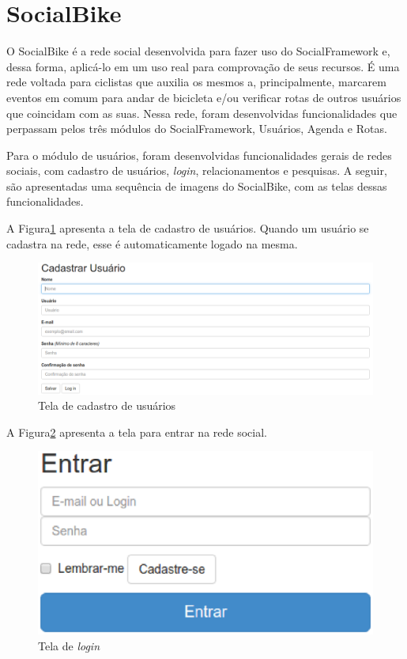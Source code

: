 \section{SocialBike}
\label{sec:SocialBike}

O SocialBike é a rede social desenvolvida para fazer uso do SocialFramework e, dessa forma, aplicá-lo em um uso real para comprovação de seus recursos. É uma rede voltada para ciclistas que auxilia os mesmos a, principalmente, marcarem eventos em comum para andar de bicicleta e/ou verificar rotas de outros usuários que coincidam com as suas. Nessa rede, foram desenvolvidas funcionalidades que perpassam pelos três módulos do SocialFramework, Usuários, Agenda e Rotas.

Para o módulo de usuários, foram desenvolvidas funcionalidades gerais de redes sociais, com cadastro de usuários, \textit{login}, relacionamentos e pesquisas. A seguir, são apresentadas uma sequência de imagens do SocialBike, com as telas dessas funcionalidades.

A Figura\ref{cadastrar_usuario} apresenta a tela de cadastro de usuários. Quando um usuário se cadastra na rede, esse é automaticamente logado na mesma.

\newpage
\begin{figure}[!h]
	\centering
	\includegraphics[scale=0.4]{figuras/resultados/cadastrar_usuario.eps}
	\caption[Tela de cadastro de usuários]{Tela de cadastro de usuários}
	\label{cadastrar_usuario}
\end{figure}

A Figura\ref{login} apresenta a tela para entrar na rede social.

\begin{figure}[!h]
	\centering
	\includegraphics[scale=0.5]{figuras/resultados/login.eps}
	\caption[Tela de login]{Tela de \textit{login}}
	\label{login}
\end{figure}

